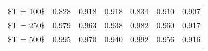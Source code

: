 % 
\begin{tabular}{ccccccc}
  \hline
  \hline
\$T = 100\$ & 0.828 & 0.918 & 0.918 & 0.834 & 0.910 & 0.907 \\ 
  \$T = 250\$ & 0.979 & 0.963 & 0.938 & 0.982 & 0.960 & 0.917 \\ 
  \$T = 500\$ & 0.995 & 0.970 & 0.940 & 0.992 & 0.956 & 0.916 \\ 
   \hline
\end{tabular}

